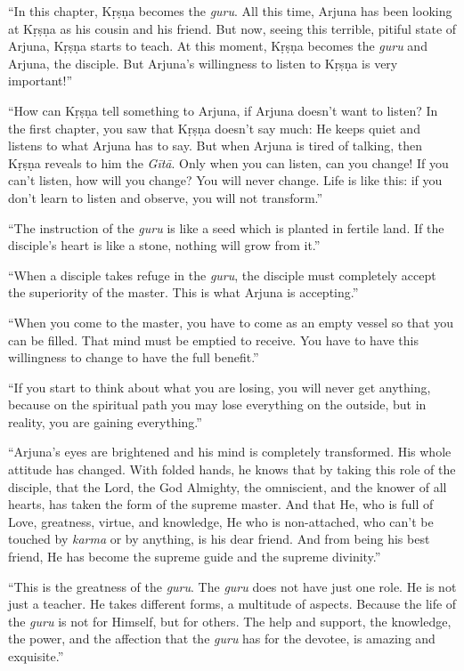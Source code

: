 \enquote{In this chapter, Kṛṣṇa becomes the \textit{guru}. All this time, Arjuna has been looking at Kṛṣṇa as his cousin and his friend. But now, seeing this terrible, pitiful state of Arjuna, Kṛṣṇa starts to teach. At this moment, Kṛṣṇa becomes the \textit{guru} and Arjuna, the disciple. But Arjuna’s willingness to listen to Kṛṣṇa is very important!}

\enquote{How can Kṛṣṇa tell something to Arjuna, if Arjuna doesn’t want to listen? In the first chapter, you saw that Kṛṣṇa doesn’t say much: He keeps quiet and listens to what Arjuna has to say. But when Arjuna is tired of talking, then Kṛṣṇa reveals to him the \textit{Gītā}. Only when you can listen, can you change! If you can’t listen, how will you change? You will never change. Life is like this: if you don’t learn to listen and observe, you will not transform.}

\enquote{The instruction of the \textit{guru} is like a seed which is planted in fertile land. If the disciple’s heart is like a stone, nothing will grow from it.}

\enquote{When a disciple takes refuge in the \textit{guru}, the disciple must completely accept the superiority of the master. This is what Arjuna is accepting.}

\enquote{When you come to the master, you have to come as an empty vessel so that you can be filled. That mind must be emptied to receive. You have to have this willingness to change to have the full benefit.}

\enquote{If you start to think about what you are losing, you will never get anything, because on the spiritual path you may lose everything on the outside, but in reality, you are gaining everything.}

\enquote{Arjuna’s eyes are brightened and his mind is completely transformed. His whole attitude has changed. With folded hands, he knows that by taking this role of the disciple, that the Lord, the God Almighty, the omniscient, and the knower of all hearts, has taken the form of the supreme master. And that He, who is full of Love, greatness, virtue, and knowledge, He who is non-attached, who can’t be touched by \textit{karma} or by anything, is his dear friend. And from being his best friend, He has become the supreme guide and the supreme divinity.}

\enquote{This is the greatness of the \textit{guru}. The \textit{guru} does not have just one role. He is not just a teacher. He takes different forms, a multitude of aspects. Because the life of the \textit{guru} is not for Himself, but for others. The help and support, the knowledge, the power, and the affection that the \textit{guru} has for the devotee, is amazing and exquisite.}

